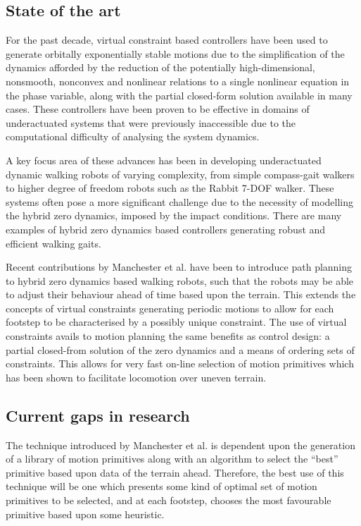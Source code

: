 \subsection{State of the art}
For the past decade, virtual constraint based controllers have been used to generate orbitally exponentially stable motions due to the simplification of the dynamics afforded by the reduction of the potentially high-dimensional, nonsmooth, nonconvex and  nonlinear relations to a single nonlinear equation in the phase variable, along with the partial closed-form solution available in many cases. These controllers have been proven to be effective in domains of underactuated systems that were previously inaccessible due to the computational difficulty of analysing the system dynamics. 

A key focus area of these advances has been in developing underactuated dynamic walking robots of varying complexity, from simple compass-gait walkers to higher degree of freedom robots such as the Rabbit 7-DOF walker. These systems often pose a more significant challenge due to the necessity of modelling the hybrid zero dynamics, imposed by the impact conditions. There are many examples of hybrid zero dynamics based controllers generating robust and efficient walking gaits. 

Recent contributions by Manchester et al. \cite{manchester13planning} have been to introduce path planning to hybrid zero dynamics based walking robots, such that the robots may be able to adjust their behaviour ahead of time based upon the terrain. This extends the concepts of virtual constraints generating periodic motions to allow for each footstep to be characterised by a possibly unique constraint. The use of virtual constraints avails to motion planning the same benefits as control design: a partial closed-from solution of the zero dynamics and a means of ordering sets of constraints. This allows for very fast on-line selection of motion primitives which has been shown to facilitate locomotion over uneven terrain.

\subsection{Current gaps in research}
The technique introduced by Manchester et al. \cite{manchester13planning} is dependent upon the generation of a library of motion primitives along with an algorithm to select the ``best'' primitive based upon data of the terrain ahead. Therefore, the best use of this technique will be one which presents some kind of optimal set of motion primitives to be selected, and at each footstep, chooses the most favourable primitive based upon some heuristic. 

